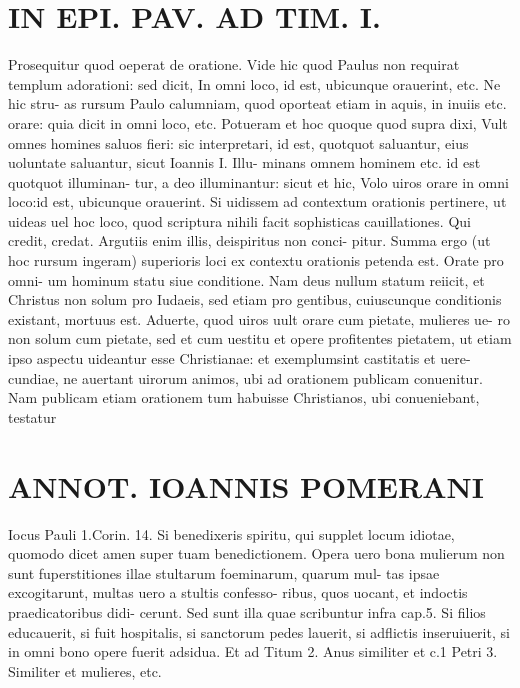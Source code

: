 \documentclass{article}
\begin{document}
\begin{pages}
\section*{IN EPI. PAV. AD TIM. I. }
\marginpar{[ p.85 ]}\pstart Prosequitur quod oeperat de oratione. Vide hic quod Paulus non requirat templum adorationi: sed dicit, In omni loco, id est, ubicunque  orauerint, etc. Ne hic stru- as rursum Paulo calumniam, quod oporteat etiam in aquis, in inuiis etc. orare: quia dicit in omni loco, etc. Potueram et hoc quoque  quod supra dixi, Vult omnes homines saluos fieri: sic interpretari, id est, quotquot saluantur, eius uoluntate saluantur, sicut Ioannis I. Illu- minans omnem hominem etc. id est quotquot illuminan- tur, a deo illuminantur: sicut et hic, Volo uiros orare in omni loco:id est, ubicunque  orauerint. Si uidissem ad contextum orationis pertinere, ut uideas uel hoc loco, quod scriptura nihili facit sophisticas cauillationes. Qui credit, credat. Argutiis enim illis, deispiritus non conci- pitur. Summa ergo (ut hoc rursum ingeram) superioris loci ex contextu orationis petenda est. Orate pro omni- um hominum statu siue conditione. Nam deus nullum statum reiicit, et Christus non solum pro Iudaeis, sed etiam pro gentibus, cuiuscunque  conditionis existant, mortuus est. Aduerte, quod uiros uult orare cum pietate, mulieres ue- ro non solum cum pietate, sed et cum uestitu et opere profitentes pietatem, ut etiam ipso aspectu uideantur esse Christianae: et exemplumsint castitatis et uere- cundiae, ne auertant uirorum animos, ubi ad orationem publicam conuenitur. Nam publicam etiam orationem tum habuisse Christianos, ubi conueniebant, testatur  \pend
\section*{ANNOT. IOANNIS POMERANI }\pstart Iocus Pauli 1.Corin. 14. Si benedixeris spiritu, qui supplet locum idiotae, quomodo dicet amen super tuam benedictionem. Opera uero bona mulierum non sunt fuperstitiones illae stultarum foeminarum, quarum mul- tas ipsae excogitarunt, multas uero a stultis confesso- ribus, quos uocant, et indoctis praedicatoribus didi- cerunt. Sed sunt illa quae scribuntur infra cap.5. Si filios educauerit, si fuit hospitalis, si sanctorum pedes lauerit, si adflictis inseruiuerit, si in omni bono opere fuerit adsidua. Et ad Titum 2. Anus similiter et c.1 Petri 3. Similiter et mulieres, etc.  \pend
{}
{}

\end{pages}
\end{document}
